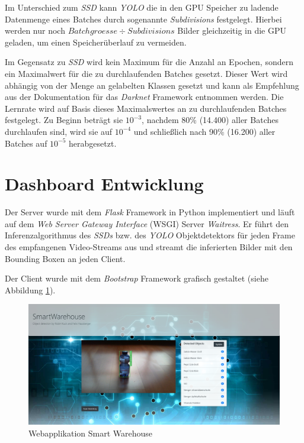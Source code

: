 Im Unterschied zum \textit{SSD} kann \textit{YOLO} die in den GPU Speicher zu ladende Datenmenge eines Batches durch sogenannte \textit{Subdivisions} festgelegt. Hierbei werden nur noch $Batchgroesse \div Subdivisions$ Bilder gleichzeitig in die GPU geladen, um einen Speicherüberlauf zu vermeiden.

Im Gegensatz zu \textit{SSD} wird kein Maximum für die Anzahl an Epochen, sondern ein Maximalwert für die zu durchlaufenden Batches gesetzt. Dieser Wert wird abhängig von der Menge an gelabelten Klassen gesetzt und kann als Empfehlung aus der Dokumentation für das \textit{Darknet} Framework entnommen werden. Die Lernrate wird auf Basis dieses Maximalswertes an zu durchlaufenden Batches festgelegt. Zu Beginn beträgt sie $10^{-3}$, nachdem 80\% (14.400) aller Batches durchlaufen sind, wird sie auf $10^{-4}$ und schließlich nach 90\% (16.200) aller Batches auf $10^{-5}$ herabgesetzt.

\section{Dashboard Entwicklung}

Der Server wurde mit dem \textit{Flask} Framework in Python implementiert und läuft auf dem \textit{Web Server Gateway Interface} (WSGI) Server \textit{Waitress}. Er führt den Inferenzalgorithmus des \textit{SSDs} bzw. des \textit{YOLO} Objektdetektors für jeden Frame des empfangenen Video-Streams aus und streamt die inferierten Bilder mit den Bounding Boxen an jeden Client. 



Der Client wurde mit dem \textit{Bootstrap} Framework grafisch gestaltet (siehe Abbildung \ref{webapp}).

\begin{figure}[H]
	\begin{center}
		\includegraphics[width=15cm]{Bilder/webapp.jpeg} 
		\caption[Webapplikation Smart Warehouse]{Webapplikation Smart Warehouse}
		\label{webapp}
	\end{center}
\end{figure}

